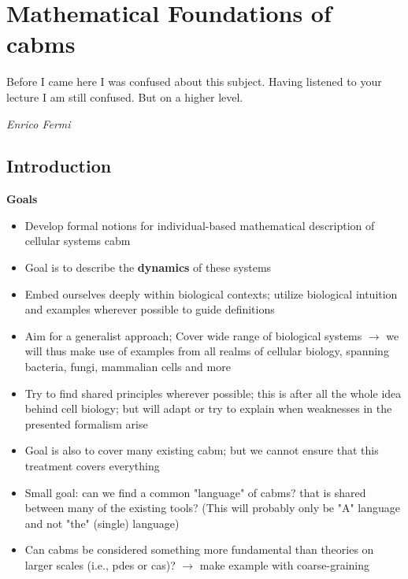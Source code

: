 \chapter{Mathematical Foundations of \aclp{cabm}}
\label{chapter:unified-language-of-cabms}

\epigraph{Before I came here I was confused about this subject. Having listened to your lecture I am
still confused. But on a higher level.}
{\textit{Enrico Fermi}}


\section{Introduction}

\textbf{Goals}
\begin{itemize}
    \item Develop formal notions for individual-based mathematical description of cellular systems
        \ac{cabm}
    \item Goal is to describe the \textbf{dynamics} of these systems
    \item Embed ourselves deeply within biological contexts; utilize biological intuition and
        examples wherever possible to guide definitions
    \item Aim for a generalist approach; Cover wide range of biological systems $\rightarrow$ we
        will thus make use of examples from all realms of cellular biology, spanning bacteria,
        fungi, mammalian cells and more
    \item Try to find shared principles wherever possible; this is after all the whole idea behind
        cell biology; but will adapt or try to explain when weaknesses in the presented formalism
        arise
    \item Goal is also to cover many existing \ac{cabm}; but we cannot ensure that this treatment
        covers everything
    \item Small goal: can we find a common "language" of \acp{cabm}? that is shared between many of
        the existing tools? (This will probably only be "A" language and not "the" (single)
        language)
    \item Can \acp{cabm} be considered something more fundamental than theories on larger scales
        (i.e., \acp{pde} or \acp{ca})? $\rightarrow$ make example with coarse-graining
\end{itemize}

